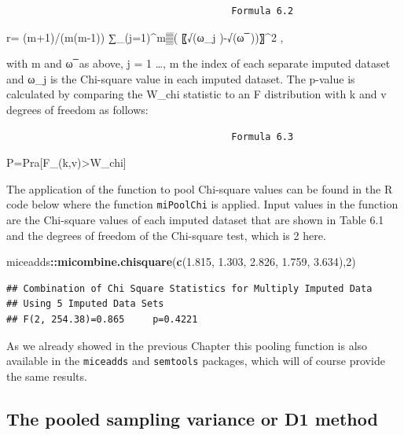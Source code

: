 \documentclass[]{book}
\newenvironment{Shaded}{\begin{snugshade}}{\end{snugshade}}
\newcommand{\KeywordTok}[1]{\textcolor[rgb]{0.13,0.29,0.53}{\textbf{#1}}}
\newcommand{\DecValTok}[1]{\textcolor[rgb]{0.00,0.00,0.81}{#1}}
\newcommand{\FloatTok}[1]{\textcolor[rgb]{0.00,0.00,0.81}{#1}}
\newcommand{\OperatorTok}[1]{\textcolor[rgb]{0.81,0.36,0.00}{\textbf{#1}}}
\newcommand{\NormalTok}[1]{#1}
\begin{document}
\begin{verbatim}
                                        Formula 6.2
\end{verbatim}

r= (m+1)/(m(m-1)) ∑\_(j=1)\^{}m▒( 〖√(ω\_j )-√(ω ̅ ))〗\^{}2 ,

with m and ω ̅ as above, j = 1 \ldots{}, m the index of each separate
imputed dataset and ω\_j is the Chi-square value in each imputed
dataset. The p-value is calculated by comparing the W\_chi statistic to
an F distribution with k and v degrees of freedom as follows:

\begin{verbatim}
                                        Formula 6.3
\end{verbatim}

P=Pra{[}F\_(k,v)\textgreater{}W\_chi{]}

The application of the function to pool Chi-square values can be found
in the R code below where the function \texttt{miPoolChi} is applied.
Input values in the function are the Chi-square values of each imputed
dataset that are shown in Table 6.1 and the degrees of freedom of the
Chi-square test, which is 2 here.

\begin{Shaded}
\begin{Highlighting}[]
\NormalTok{miceadds}\OperatorTok{::}\KeywordTok{micombine.chisquare}\NormalTok{(}\KeywordTok{c}\NormalTok{(}\FloatTok{1.815}\NormalTok{,}
            \FloatTok{1.303}\NormalTok{,}
            \FloatTok{2.826}\NormalTok{,}
            \FloatTok{1.759}\NormalTok{,}
            \FloatTok{3.634}\NormalTok{),}\DecValTok{2}\NormalTok{)}
\end{Highlighting}
\end{Shaded}

\begin{verbatim}
## Combination of Chi Square Statistics for Multiply Imputed Data
## Using 5 Imputed Data Sets
## F(2, 254.38)=0.865     p=0.4221
\end{verbatim}

As we already showed in the previous Chapter this pooling function is
also available in the \texttt{miceadds} and \texttt{semtools} packages,
which will of course provide the same results.

\subsection{The pooled sampling variance or D1
method}\label{the-pooled-sampling-variance-or-d1-method}
\end{document}
